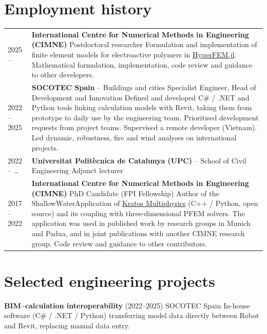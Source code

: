 \documentclass[12pt]{article}
\begin{document}
\section{Employment history}
\begin{tabularx}{\linewidth}{lX}
    2025 -- \enspace 2026 &
    \textbf{International Centre for Numerical Methods in Engineering (CIMNE)} \newline
    Postdoctoral researcher \newline
    Formulation and implementation of finite element models for electroactive polymers in \href{https://github.com/MultiSimOLab/HyperFEM.jl}{HyperFEM.jl}. Mathematical formulation, implementation, code review and guidance to other developers. \\[.4em]

    2022 -- 2025 &
    \textbf{SOCOTEC Spain} -- Buildings and cities \newline
    Specialist Engineer, Head of Development and Innovation \newline
    Defined and developed C\# / .NET and Python tools linking calculation models with Revit, taking them from prototype to daily use by the engineering team. Prioritised development requests from project teams. Supervised a remote developer (Vietnam). Led dynamic, robustness, fire and wind analyses on international projects. \\[.4em]

    2022 -- \enspace \dots &
    \textbf{Universitat Politècnica de Catalunya (UPC)} -- School of Civil Engineering \newline
    Adjunct lecturer \\[.4em]

    2017 -- 2022 &
    \textbf{International Centre for Numerical Methods in Engineering (CIMNE)} \newline
    PhD Candidate (FPI Fellowship) \newline
    Author of the ShallowWaterApplication of \href{https://github.com/KratosMultiphysics/Kratos}{Kratos Multiphysics} (C++ / Python, open source) and its coupling with three-dimensional PFEM solvers. The application was used in published work by research groups in Munich and Padua, and in joint publications with another CIMNE research group. Code review and guidance to other contributors. \\
\end{tabularx}


\section{Selected engineering projects}
\parbox{\linewidth}{
    \textbf{BIM--calculation interoperability} (2022--2025) SOCOTEC Spain \newline
    In-house software (C\# / .NET / Python) transferring model data directly between Robot and Revit, replacing manual data entry.}
\end{document}
